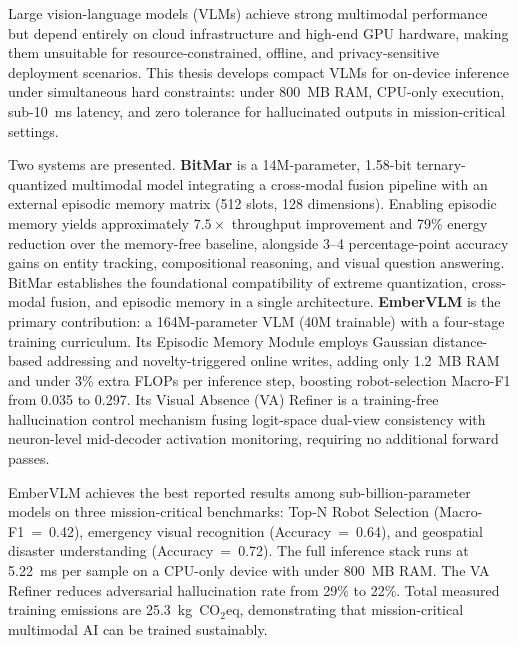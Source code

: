 {\renewcommand{\baselinestretch}{1.2}\normalsize
Large vision-language models (VLMs) achieve strong multimodal performance but depend entirely on cloud infrastructure and high-end GPU hardware, making them unsuitable for resource-constrained, offline, and privacy-sensitive deployment scenarios. This thesis develops compact VLMs for on-device inference under simultaneous hard constraints: under 800~MB RAM, CPU-only execution, sub-10~ms latency, and zero tolerance for hallucinated outputs in mission-critical settings.

Two systems are presented. \textbf{BitMar} is a 14M-parameter, 1.58-bit ternary-quantized multimodal model integrating a cross-modal fusion pipeline with an external episodic memory matrix (512 slots, 128 dimensions). Enabling episodic memory yields approximately $7.5\times$ throughput improvement and 79\% energy reduction over the memory-free baseline, alongside 3--4 percentage-point accuracy gains on entity tracking, compositional reasoning, and visual question answering. BitMar establishes the foundational compatibility of extreme quantization, cross-modal fusion, and episodic memory in a single architecture. \textbf{EmberVLM} is the primary contribution: a 164M-parameter VLM (40M trainable) with a four-stage training curriculum. Its Episodic Memory Module employs Gaussian distance-based addressing and novelty-triggered online writes, adding only 1.2~MB RAM and under 3\% extra FLOPs per inference step, boosting robot-selection Macro-F1 from 0.035 to 0.297. Its Visual Absence (VA) Refiner is a training-free hallucination control mechanism fusing logit-space dual-view consistency with neuron-level mid-decoder activation monitoring, requiring no additional forward passes.

EmberVLM achieves the best reported results among sub-billion-parameter models on three mission-critical benchmarks: Top-N Robot Selection (Macro-F1~=~0.42), emergency visual recognition (Accuracy~=~0.64), and geospatial disaster understanding (Accuracy~=~0.72). The full inference stack runs at 5.22~ms per sample on a CPU-only device with under 800~MB RAM. The VA Refiner reduces adversarial hallucination rate from 29\% to 22\%. Total measured training emissions are 25.3~kg~CO$_2$eq, demonstrating that mission-critical multimodal AI can be trained sustainably.

}
